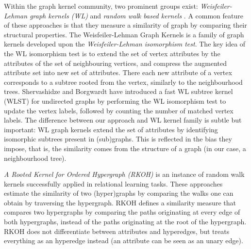 Within the graph kernel community, two prominent groups exist:  \textit{Weisfeiler-Lehman graph kernels (WL)} \cite{Shervashidze2011,shervashidze09fastsubtree,FrasconiCRG14,haussler99convolution,ICPR-2014-BaiRH}  and \textit{random walk based kernels} \cite{WachmanK07,Lovasz1996}.
A common feature of these approaches is that they measure a similarity of graph by comparing their structural properties.
The Weisfeiler-Lehman Graph Kernels is a family of graph kernels developed upon the \textit{Weisfeiler-Lehman isomorphism test}.
The key idea of the WL isomorphism test is to extend the set of vertex attributes by the attributes of the set of neighbouring vertices, and compress the augmented attribute set into new set of attributes. 
There each new attribute of a vertex corresponds to a subtree rooted from the vertex, similarly to the neighbourhood trees.
Shervashidze and Borgwardt have introduced a fast WL subtree kernel (WLST) \cite{shervashidze09fastsubtree} for undirected graphs by performing the WL isomorphism test to update the vertex labels, followed by counting the number of matched vertex labels.
The difference between our approach and WL kernel family is subtle but important: WL graph kernels extend the set of attributes by identifying isomorphic subtrees present in (sub)graphs.
This is reflected in the bias they impose, that is, the similarity comes from the structure of a graph (in our case, a neighbourhood tree).


\textit{A Rooted Kernel for Ordered Hypergraph (RKOH)} \cite{WachmanK07} is an instance of random walk kernels successfully applied in relational learning tasks.
These approaches estimate the similarity of two (hyper)graphs by comparing the walks one can obtain by traversing the hypergraph. 
RKOH defines a similarity measure that compares two hypergraphs by comparing the paths originating at every edge of both hypergraphs, instead of the paths originating at the root of the hypergraph.
RKOH does not differentiate between attributes and hyperedges, but treats everything as an hyperedge instead (an attribute can be seen as an unary edge).


